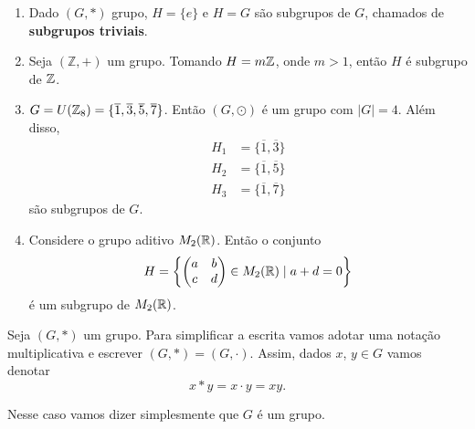 \begin{exemplos}
    \begin{enumerate}[label={\arabic*})]
        \item Dado $(G,*)$ grupo, $H=\{e\}$ e $H=G$ são subgrupos de $G$, chamados de \textbf{subgrupos triviais}.

        \item Seja $(\mathbb{Z},+)$ um grupo. Tomando $H = m\mathbb{Z}$, onde $m > 1$, então $H$ é subgrupo de $\mathbb{Z}$.

        \item $G = U(\mathbb{Z}_8) = \{\overline{1}, \overline{3}, \overline{5}, \overline{7}\}$. Então $(G,\odot)$ é um grupo com $|G| = 4$. Além disso,
        \begin{align*}
            H_1 &= \{\overline{1}, \overline{3}\}\\
            H_2 &= \{\overline{1}, \overline{5}\}\\
            H_3 &= \{\overline{1}, \overline{7}\}
        \end{align*}
        são subgrupos de $G$.

        \item Considere o grupo aditivo $M_2(\mathbb{R})$. Então o conjunto
        \[
            H = \left\{\begin{pmatrix}
                a & b\\c & d
            \end{pmatrix} \in M_2(\mathbb{R}) \mid a + d = 0\right\}
        \]
        é um subgrupo de $M_2(\mathbb{R})$.
    \end{enumerate}
\end{exemplos}

Seja $(G, *)$ um grupo. Para simplificar a escrita vamos adotar uma notação multiplicativa e escrever $(G, *) = (G, \cdot)$. Assim, dados $x$, $y \in G$ vamos denotar
\[
    x * y = x \cdot y = xy.
\]

Nesse caso vamos dizer simplesmente que $G$ é um grupo.

